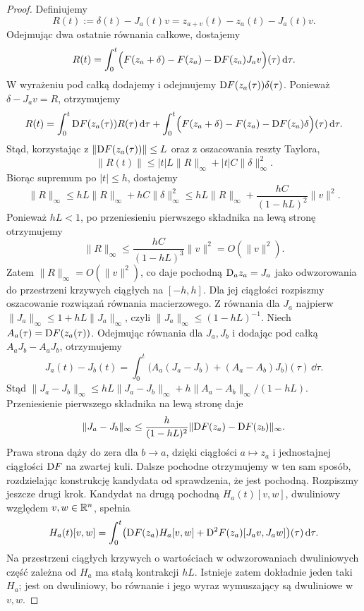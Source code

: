 \begin{proof}
Definiujemy
\[
R(t):=\delta(t)-J_a(t)v
      =z_{a+v}(t)-z_a(t)-J_a(t)v.
\]
Odejmując dwa ostatnie równania całkowe, dostajemy
\[
R(t)
=
\int_0^t
\Bigl(
F(z_a+\delta)-F(z_a)-\mathrm D F(z_a)J_av
\Bigr)(\tau)\,\mathrm d\tau.
\]
W wyrażeniu pod całką dodajemy i odejmujemy
$\mathrm D F(z_a(\tau))\delta(\tau)$. Ponieważ
$\delta-J_av=R$, otrzymujemy
\[
R(t)
=
\int_0^t \mathrm D F(z_a(\tau))R(\tau)\,\mathrm d\tau
+
\int_0^t
\Bigl(
F(z_a+\delta)-F(z_a)-\mathrm D F(z_a)\delta
\Bigr)(\tau)\,\mathrm d\tau.
\]
Stąd, korzystając z $\|\mathrm D F(z_a(\tau))\|\leq L$ oraz z oszacowania
reszty Taylora,
\[
\|R(t)\|
\leq |t|L\|R\|_\infty
     +|t|C\|\delta\|_\infty^2.
\]
Biorąc supremum po $|t|\leq h$, dostajemy
\[
\|R\|_\infty
\leq hL\|R\|_\infty+hC\|\delta\|_\infty^2
\leq hL\|R\|_\infty
+\frac{hC}{(1-hL)^2}\|v\|^2.
\]
Ponieważ $hL<1$, po przeniesieniu pierwszego składnika na lewą stronę
otrzymujemy
\[
\|R\|_\infty
\leq
\frac{hC}{(1-hL)^3}\|v\|^2
=
O(\|v\|^2).
\]
Zatem $\|R\|_\infty=O(\|v\|^2)$, co daje pochodną
$\mathrm D_a z_a=J_a$ jako odwzorowania do przestrzeni krzywych
ciągłych na $[-h,h]$. Dla jej ciągłości rozpiszmy
oszacowanie rozwiązań równania macierzowego.
Z równania dla $J_a$ najpierw
$\|J_a\|_\infty\leq1+hL\|J_a\|_\infty$,
czyli $\|J_a\|_\infty\leq(1-hL)^{-1}$.
Niech $A_a(\tau)=\mathrm D F(z_a(\tau))$.
Odejmując równania dla $J_a,J_b$ i dodając pod całką
$A_aJ_b-A_aJ_b$, otrzymujemy
\[
 J_a(t)-J_b(t)=\int_0^t
 \bigl(A_a(J_a-J_b)+(A_a-A_b)J_b\bigr)(\tau)\,\dd\tau.
\]
Stąd
$\|J_a-J_b\|_\infty
\leq hL\|J_a-J_b\|_\infty
+h\|A_a-A_b\|_\infty/(1-hL)$.
Przeniesienie pierwszego składnika na lewą stronę daje
\[
 \|J_a-J_b\|_\infty
 \leq\frac{h}{(1-hL)^2}
 \|\mathrm D F(z_a)-\mathrm D F(z_b)\|_\infty.
\]
Prawa strona dąży do zera dla $b\to a$, dzięki ciągłości
$a\mapsto z_a$ i jednostajnej ciągłości $\mathrm D F$ na zwartej kuli.
Dalsze pochodne otrzymujemy w ten sam sposób, rozdzielając
konstrukcję kandydata od sprawdzenia, że jest pochodną.
Rozpiszmy jeszcze drugi krok. Kandydat na drugą pochodną
$H_a(t)[v,w]$, dwuliniowy względem $v,w\in\mathbb{R}^n$, spełnia
\[
 H_a(t)[v,w]=\int_0^t\bigl(
 \mathrm D F(z_a)H_a[v,w]
 +\mathrm D^2F(z_a)[J_av,J_aw]\bigr)(\tau)\,\mathrm d\tau.
\]
Na przestrzeni ciągłych krzywych o wartościach w odwzorowaniach
dwuliniowych część zależna od $H_a$ ma stałą kontrakcji $hL$.
Istnieje zatem dokładnie jeden taki $H_a$; jest on dwuliniowy,
bo równanie i jego wyraz wymuszający są dwuliniowe w $v,w$.


\end{proof}
